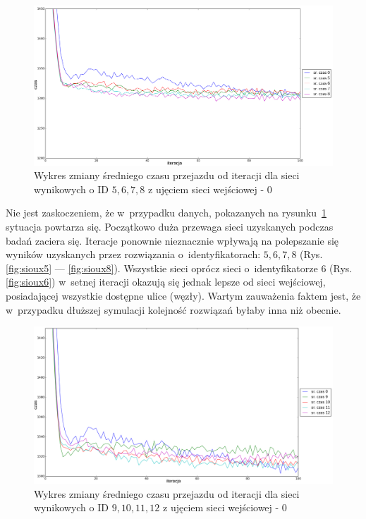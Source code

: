 \documentclass[twoside,12pt]{report}
\begin{document}
\begin{figure}[htbp]
\centering
\includegraphics[width=1\textwidth]{img/iters/iters2}
\caption{Wykres zmiany średniego czasu przejazdu od iteracji dla sieci wynikowych  o ID $5, 6, 7, 8$ z ujęciem sieci wejściowej - $0$}
\label{fig:iters2}
\end{figure}

Nie jest zaskoczeniem, że w~przypadku danych, pokazanych na rysunku~\ref{fig:iters2} sytuacja powtarza się. Początkowo duża przewaga sieci uzyskanych podczas badań zaciera się. Iteracje ponownie nieznacznie wpływają na polepszanie się wyników uzyskanych przez rozwiązania o~identyfikatorach: $5, 6, 7, 8$ (Rys. \ref{fig:sioux5} --- \ref{fig:sioux8}). Wszystkie sieci oprócz sieci o~identyfikatorze $6$ (Rys. \ref{fig:sioux6}) w~setnej iteracji okazują się jednak lepsze od sieci wejściowej, posiadającej wszystkie dostępne ulice (węzły). Wartym zauważenia faktem jest, że w~przypadku dłuższej symulacji kolejność rozwiązań byłaby inna niż obecnie.

\begin{figure}[htbp]
\centering
\includegraphics[width=1\textwidth]{img/iters/iters3}
\caption{Wykres zmiany średniego czasu przejazdu od iteracji dla sieci wynikowych  o ID $9, 10, 11, 12$ z ujęciem sieci wejściowej - $0$}
\label{fig:iters3}
\end{figure}
\end{document}
